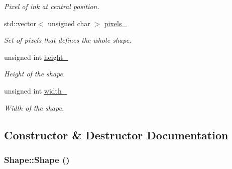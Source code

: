\begin{CompactItemize}
\begin{CompactList}\small\item\em Pixel of ink at central position. \item\end{CompactList}\item 
\hypertarget{class_shape_4753b295c12e83195d8fd9bb6fb86ec4}{
std::vector$<$ unsigned char $>$ \hyperlink{class_shape_4753b295c12e83195d8fd9bb6fb86ec4}{pixels\_\-}}
\label{class_shape_4753b295c12e83195d8fd9bb6fb86ec4}

\begin{CompactList}\small\item\em Set of pixels that defines the whole shape. \item\end{CompactList}\item 
\hypertarget{class_shape_76354eeb3b4c5c6c9125f4195c3c274c}{
unsigned int \hyperlink{class_shape_76354eeb3b4c5c6c9125f4195c3c274c}{height\_\-}}
\label{class_shape_76354eeb3b4c5c6c9125f4195c3c274c}

\begin{CompactList}\small\item\em Height of the shape. \item\end{CompactList}\item 
\hypertarget{class_shape_863661d529942b525830d2208259583b}{
unsigned int \hyperlink{class_shape_863661d529942b525830d2208259583b}{width\_\-}}
\label{class_shape_863661d529942b525830d2208259583b}

\begin{CompactList}\small\item\em Width of the shape. \item\end{CompactList}\end{CompactItemize}


\subsection{Constructor \& Destructor Documentation}
\hypertarget{class_shape_aa8d87171e65e0d8ba3c5459978992a7}{
\subsubsection[Shape]{\setlength{\rightskip}{0pt plus 5cm}Shape::Shape ()}}
\label{class_shape_aa8d87171e65e0d8ba3c5459978992a7}


